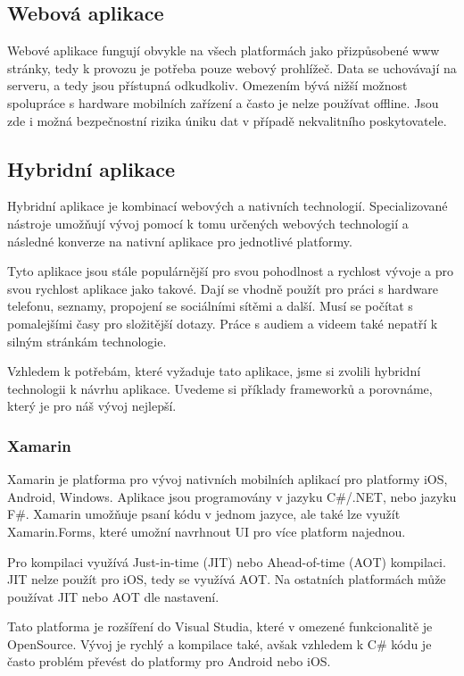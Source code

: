 \documentclass[11pt,twoside,a4paper]{book}
\begin{document}
\subsection{Webová aplikace}
Webové aplikace fungují obvykle na všech platformách jako přizpůsobené www stránky, tedy k provozu je potřeba pouze webový prohlížeč. Data se uchovávají na serveru, a tedy jsou přístupná odkudkoliv. Omezením bývá nižší možnost spolupráce s hardware mobilních zařízení a často je nelze používat offline. Jsou zde i možná bezpečnostní rizika úniku dat v případě nekvalitního poskytovatele.

\subsection{Hybridní aplikace}
Hybridní aplikace je kombinací webových a nativních technologií. Specializované nástroje umožňují vývoj pomocí k tomu určených webových technologií a následné konverze na nativní aplikace pro jednotlivé platformy. 

Tyto aplikace jsou stále populárnější pro svou pohodlnost a rychlost vývoje a pro svou rychlost aplikace jako takové. Dají se vhodně použít pro práci s hardware telefonu, seznamy, propojení se sociálními sítěmi a další. Musí se počítat s pomalejšími časy pro složitější dotazy. Práce s audiem a videem také nepatří k silným stránkám technologie. 

Vzhledem k potřebám, které vyžaduje tato aplikace, jsme si zvolili hybridní technologii k návrhu aplikace. Uvedeme si příklady frameworků a porovnáme, který je pro náš vývoj nejlepší.

\subsubsection{Xamarin}
Xamarin je platforma pro vývoj nativních mobilních aplikací pro platformy iOS, Android, Windows. Aplikace jsou programovány v jazyku C\#/.NET, nebo jazyku F\#. 
Xamarin umožňuje psaní kódu v jednom jazyce, ale také lze využít Xamarin.Forms, které umožní navrhnout UI pro více platform najednou. 

Pro kompilaci využívá Just-in-time (JIT) nebo Ahead-of-time (AOT) kompilaci. JIT nelze použít pro iOS, tedy se využívá AOT. Na ostatních platformách může používat JIT nebo AOT dle nastavení. \cite{cruxlab}

Tato platforma je rozšíření do Visual Studia, které v omezené funkcionalitě je OpenSource. Vývoj je rychlý a kompilace také, avšak vzhledem k C\# kódu je často problém převést do platformy pro Android nebo iOS. 
\end{document}
